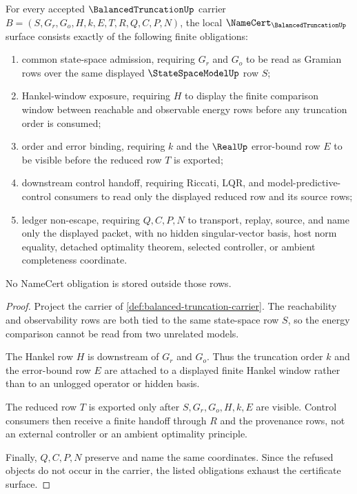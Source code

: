 \begin{theorem}
\label{thm:balanced-truncation-namecert-obligations}
For every accepted $\BalancedTruncationUp$ carrier $B=(S,G_r,G_o,H,k,E,T,R,Q,C,P,N)$, the local $\NameCert_{\BalancedTruncationUp}$ surface consists exactly of the following finite obligations:
\begin{enumerate}
\item common state-space admission, requiring $G_r$ and $G_o$ to be read as Gramian rows over the same displayed $\StateSpaceModelUp$ row $S$;
\item Hankel-window exposure, requiring $H$ to display the finite comparison window between reachable and observable energy rows before any truncation order is consumed;
\item order and error binding, requiring $k$ and the $\RealUp$ error-bound row $E$ to be visible before the reduced row $T$ is exported;
\item downstream control handoff, requiring Riccati, LQR, and model-predictive-control consumers to read only the displayed reduced row and its source rows;
\item ledger non-escape, requiring $Q,C,P,N$ to transport, replay, source, and name only the displayed packet, with no hidden singular-vector basis, host norm equality, detached optimality theorem, selected controller, or ambient completeness coordinate.
\end{enumerate}
No NameCert obligation is stored outside those rows.
\end{theorem}
\begin{proof}
Project the carrier of \autoref{def:balanced-truncation-carrier}. The reachability and observability rows are both tied to the same state-space row $S$, so the energy comparison cannot be read from two unrelated models.

The Hankel row $H$ is downstream of $G_r$ and $G_o$. Thus the truncation order $k$ and the error-bound row $E$ are attached to a displayed finite Hankel window rather than to an unlogged operator or hidden basis.

The reduced row $T$ is exported only after $S,G_r,G_o,H,k,E$ are visible. Control consumers then receive a finite handoff through $R$ and the provenance rows, not an external controller or an ambient optimality principle.

Finally, $Q,C,P,N$ preserve and name the same coordinates. Since the refused objects do not occur in the carrier, the listed obligations exhaust the certificate surface.
\end{proof}

